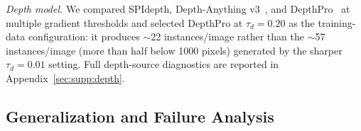 \documentclass{article}
\renewcommand{\paragraph}[1]{\par\smallskip\noindent\textit{#1}\hspace{0.5em}\ignorespaces}
\begin{document}
\paragraph{Depth model.}
We compared SPIdepth, Depth-Anything v3~\cite{lin2025da3}, and DepthPro~\cite{bochkovskii2024depthpro} at multiple gradient thresholds and selected DepthPro at $\tau_d{=}0.20$ as the training-data configuration: it produces $\sim$22 instances/image rather than the $\sim$57 instances/image (more than half below 1000 pixels) generated by the sharper $\tau_d{=}0.01$ setting. Full depth-source diagnostics are reported in Appendix~\ref{sec:supp:depth}.


\subsection{Generalization and Failure Analysis}
\label{sec:exp:generalization}
\end{document}
